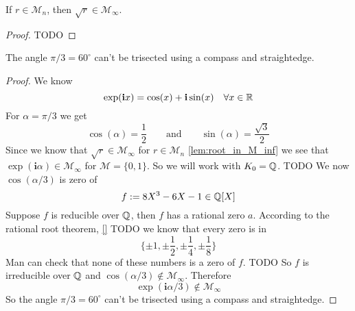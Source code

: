\documentclass{../Proof_layout_PDF/TemplateExercise}
\begin{document}
\begin{lemma}
\label{lem:root_in_M_inf}
    If $r\in \mathcal{M}_{n}$, then $\sqrt{r} \in \mathcal{M}_{\infty}$.
\end{lemma}
\begin{proof}
    TODO %
\end{proof}
\begin{lemma}

\end{lemma}
\begin{theorem}
    The angle $\pi / 3 = 60^{\circ}$ can't be trisected using a compass and straightedge.
\end{theorem}
\begin{proof}
    We know
    \begin{equation*}
        \exp(\textbf{i}x) = \cos(x) + \textbf{i} \sin(x) \quad \forall x \in \mathbb{R}
    \end{equation*}
    For $\alpha = \pi / 3$ we get
    \begin{equation*}
        \cos(\alpha) = \frac{1}{2}\qquad \text{and}\qquad \sin(\alpha) = \frac{\sqrt{3}}{2}
    \end{equation*}
    Since we know that $\sqrt{r} \in \mathcal{M}_{\infty}$ for $r \in \mathcal{M}_n$ \ref*{lem:root_in_M_inf}
    we see that $\exp(\textbf{i} \alpha) \in \mathcal{M}_{\infty}$ for $\mathcal{M} = \{0,1\}$. \newline
    So we will work with $K_0 = \mathbb{Q}$. \newline
    TODO \newline %
    We now $\cos(\alpha/3)$ is zero of
    \begin{equation*}
        f := 8 X^3 - 6 X - 1 \in \mathbb{Q}[X]
    \end{equation*}
    Suppose $f$ is reducible over $\mathbb{Q}$, then $f$ has a rational zero $a$. According to the rational root theorem, \ref*{}
        TODO %
     we know that every zero is in
     \begin{equation*}
        \{ \pm 1, \pm \frac{1}{2}, \pm \frac{1}{4}, \pm \frac{1}{8} \}
     \end{equation*}
     Man can check that none of these numbers is a zero of $f$.
     TODO %
     So $f$ is irreducible over $\mathbb{Q}$ and $\cos(\alpha/3) \notin \mathcal{M}_{\infty}$.
     Therefore
        \begin{equation*}
            \exp(\textbf{i} \alpha/3) \notin \mathcal{M}_{\infty}
        \end{equation*}
    So the angle $\pi / 3 = 60^{\circ}$ can't be trisected using a compass and straightedge.
\end{proof}
\end{document}
